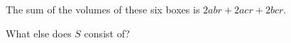 




















The sum of the volumes of these six boxes is $2abr + 2acr + 2bcr.$

What else does $S$ consist of?

